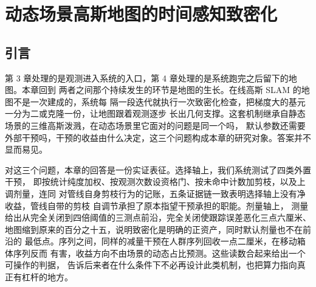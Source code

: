 %
%

\chapter{动态场景高斯地图的时间感知致密化}
\label{ch:study3}

\section{引言}

第 3 章处理的是观测进入系统的入口，第 4 章处理的是系统跑完之后留下的地图。本章回到
两者之间那个持续发生的环节是地图的生长。在线高斯 SLAM 的地图不是一次建成的，系统每
隔一段迭代就执行一次致密化检查，把梯度大的基元一分为二或克隆一份，让地图跟着观测逐步
长出几何支撑。这套机制继承自静态场景的三维高斯泼溅，在动态场景里它面对的问题是同一个吗，
默认参数还需要外部干预吗，干预的收益由什么决定，这三个问题构成本章的研究对象。答案并不显而易见。

对这三个问题，本章的回答是一份实证表征。选择轴上，我们系统测试了四类外置干预，
即按统计纯度加权、按观测次数设资格门、按未命中计数加剪枝，以及上调剂量，连同
对管线自身剪枝行为的记账，五条证据链一致表明选择轴上没有净收益，管线自带的剪枝
自调节承担了原本指望干预承担的职能。剂量轴上，
测量给出从完全关闭到四倍阈值的三测点前沿，完全关闭使跟踪误差恶化三点六厘米、
地图缩到原来的百分之十五，说明致密化是明确的正资产，同时默认剂量也不在前沿的
最低点。序列之间，同样的减量干预在人群序列回收一点二厘米，在移动箱体序列反而
有害，收益方向不由场景的动态占比预测。这些读数合起来给出一个可操作的判据，
告诉后来者在什么条件下不必再设计此类机制，也把算力指向真正有杠杆的地方。

